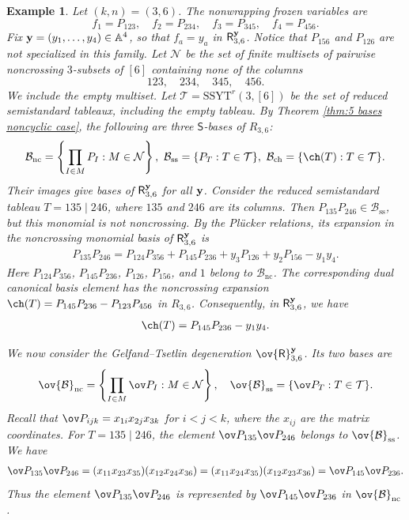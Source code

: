 \documentclass[11pt]{amsart}
\numberwithin{equation}{section}
\newtheorem{example}[thm]{Example}
\newcommand{\bA}{{\mathbb A}}
\newcommand{\bfy}{{\bf y}}
\newcommand{\SSYT}{\mathrm{SSYT}}
\begin{document}
\begin{example}
Let $(k,n)=(3,6)$. The nonwrapping frozen
variables are
\[
f_1=P_{123},\quad f_2=P_{234},\quad
f_3=P_{345},\quad f_4=P_{456}.
\]
Fix $\bfy=(y_1,\ldots,y_4)\in\bA^4$,
so that $f_a=y_a$ in
${\mathsf R}_{3,6}^{\bfy}$.
Notice that $P_{156}$ and $P_{126}$
are not specialized in this family. Let $\mathcal N$ be the set of finite
multisets of pairwise noncrossing
$3$-subsets of $[6]$ containing none
of the columns
\[
123,\quad234,\quad345,\quad456.
\]
We include the empty multiset.
Let $\mathcal T=\SSYT^r(3,[6])$ be
the set of reduced semistandard tableaux,
including the empty tableau.
By Theorem \ref{thm:5 bases noncyclic case}, the following
are three ${\mathsf S}$-bases of $R_{3,6}$:
\[
\begin{aligned}
\mathcal B_{\mathrm{nc}}
=\left\{\prod_{I\in M}P_I:
M\in\mathcal N\right\},\ 
\mathcal B_{\mathrm{ss}}
=\{P_T:T\in\mathcal T\},\
\mathcal B_{\mathrm{ch}}
=\{\ch(T):T\in\mathcal T\}.
\end{aligned}
\]
Their images give bases of
${\mathsf R}_{3,6}^{\bfy}$ for all $\bfy$.
Consider the reduced semistandard tableau
$T=135\mid246$, where $135$ and $246$
are its columns.
Then $P_{135}P_{246}\in\mathcal B_{\mathrm{ss}}$,
but this monomial is not noncrossing.
By the Pl\"ucker relations, its expansion
in the noncrossing monomial basis of
${\mathsf R}_{3,6}^{\bfy}$ is
\[
\begin{aligned}
P_{135}P_{246}
=P_{124}P_{356}+P_{145}P_{236}+y_3P_{126}+y_2P_{156}-y_1y_4.
\end{aligned}
\]
Here $P_{124}P_{356}$,
$P_{145}P_{236}$, $P_{126}$,
$P_{156}$, and $1$ belong to
$\mathcal B_{\mathrm{nc}}$.
The corresponding dual canonical basis
element has the noncrossing expansion
$\ch(T)=P_{145}P_{236}-P_{123}P_{456}$
in $R_{3,6}$. Consequently, in
${\mathsf R}_{3,6}^{\bfy}$, we have
\begin{align*}
\ch(T)=P_{145}P_{236}-y_1y_4.
\end{align*}

We now consider the Gelfand--Tsetlin
degeneration
$\ov{\mathsf R}_{3,6}^{\bfy}$.
Its two bases are
\[
\begin{aligned}
\ov{\mathcal B}_{\mathrm{nc}}
=\left\{\prod_{I\in M}\ov P_I:
M\in\mathcal N\right\}, \quad 
\ov{\mathcal B}_{\mathrm{ss}}=\{\ov P_T:T\in\mathcal T\}.
\end{aligned}
\]
Recall that $\ov P_{ijk}=x_{1i}x_{2j}x_{3k}$
for $i<j<k$, where the $x_{ij}$ are
the matrix coordinates. For $T=135\mid246$, the element
$\ov P_{135}\ov P_{246}$ belongs to
$\ov{\mathcal B}_{\mathrm{ss}}$. We have
\[
\begin{aligned}
\ov P_{135}\ov P_{246}
=(x_{11}x_{23}x_{35})
  (x_{12}x_{24}x_{36})
=(x_{11}x_{24}x_{35})
  (x_{12}x_{23}x_{36})
=\ov P_{145}\ov P_{236}.
\end{aligned}
\]
Thus the element $\ov P_{135}\ov P_{246}$
is represented by $\ov P_{145}\ov P_{236}$
in $\ov{\mathcal B}_{\mathrm{nc}}$.
\end{example}
\end{document}
